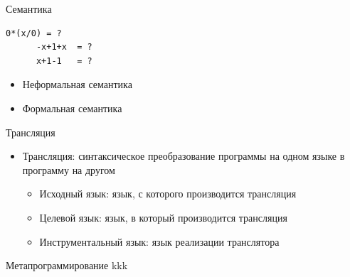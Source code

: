 \documentclass[aspectratio=43]{beamer}
\begin{document}
\begin{frame}[fragile]{Семантика}
  \newsavebox{\mybox}
  \begin{lrbox}{\mybox}
    \begin{lstlisting}[basicstyle=\fontencoding{T1}\footnotesize\fontfamily{lmtt}\fontseries{c}\selectfont,morekeywords={if,else},keywordstyle=\underline]
      0*(x/0) = ?
      -x+1+x  = ?
      x+1-1   = ?
    \end{lstlisting}
  \end{lrbox}
  \begin{itemize}
  \item Неформальная семантика
  \item Формальная семантика
  \end{itemize}  
\end{frame}

\begin{frame}[fragile]{Трансляция}
  \begin{itemize}
  \item Трансляция: синтаксическое преобразование программы на одном языке в программу на другом
    \begin{itemize}
      \item Исходный язык: язык, с которого производится трансляция
      \item Целевой язык: язык, в который производится трансляция
      \item Инструментальный язык: язык реализации транслятора
    \end{itemize}
  \end{itemize}  
\end{frame}

\begin{frame}[fragile]{Метапрограммирование}
  kkk
\end{frame}
\end{document}
